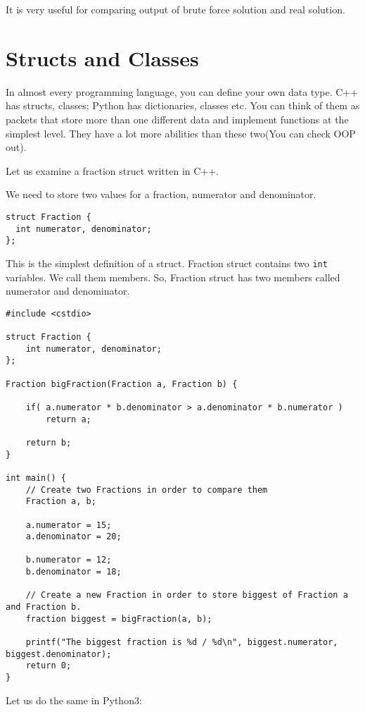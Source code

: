 \documentclass[12pt]{article}
\begin{document}
It is very useful for comparing output of brute force solution and real solution.

\section{Structs and Classes}
In almost every programming language, you can define your own data type. C++ has structs, classes; Python has dictionaries, classes etc. You can think of them as packets that store more than one different data and implement functions at the simplest level. They have a lot more abilities than these two(You can check OOP out).

Let us examine a fraction struct written in C++.

We need to store two values for a fraction, numerator and denominator.

\begin{verbatim}
struct Fraction {
  int numerator, denominator;
};
\end{verbatim}

This is the simplest definition of a struct. Fraction struct contains two \lstinline{int} variables. We call them members. So, Fraction struct has two members called numerator and denominator. 

\begin{verbatim}
#include <cstdio>

struct Fraction {
    int numerator, denominator;
};

Fraction bigFraction(Fraction a, Fraction b) {

    if( a.numerator * b.denominator > a.denominator * b.numerator )
        return a;

    return b;
}

int main() {
    // Create two Fractions in order to compare them
    Fraction a, b;
    
    a.numerator = 15;
    a.denominator = 20;
    
    b.numerator = 12;
    b.denominator = 18;
    
    // Create a new Fraction in order to store biggest of Fraction a and Fraction b.
    fraction biggest = bigFraction(a, b);
    
    printf("The biggest fraction is %d / %d\n", biggest.numerator, biggest.denominator);
    return 0;
}
\end{verbatim}

\cleardoublepage
Let us do the same in Python3:
\end{document}

